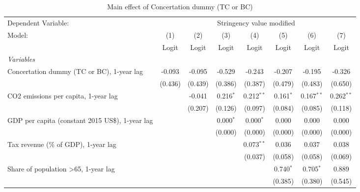 
\begin{table}[htbp]
   \caption{Main effect of Concertation dummy (TC or BC)}
   \centering
   \begin{tabular}{lccccccc}
      \toprule
      Dependent Variable: & \multicolumn{7}{c}{Stringency value modified}\\
      Model:                                                & (1)     & (2)     & (3)         & (4)          & (5)         & (6)          & (7)\\  
                                                            &  Logit  & Logit   & Logit       & Logit        & Logit       & Logit        & Logit\\  
      \midrule
      \emph{Variables}\\
      Concertation dummy (TC or BC), 1-year lag             & -0.093  & -0.095  & -0.529      & -0.243       & -0.207      & -0.195       & -0.326\\   
                                                            & (0.436) & (0.439) & (0.386)     & (0.387)      & (0.479)     & (0.483)      & (0.650)\\   
      CO2 emissions per capita, 1-year lag                  &         & -0.041  & 0.216$^{*}$ & 0.212$^{**}$ & 0.161$^{*}$ & 0.167$^{**}$ & 0.262$^{**}$\\   
                                                            &         & (0.207) & (0.126)     & (0.097)      & (0.084)     & (0.085)      & (0.118)\\   
      GDP per capita (constant 2015 US\$), 1-year lag       &         &         & 0.000$^{*}$ & 0.000$^{*}$  & 0.000       & 0.000        & 0.000\\   
                                                            &         &         & (0.000)     & (0.000)      & (0.000)     & (0.000)      & (0.000)\\   
      Tax revenue (\% of GDP), 1-year lag                   &         &         &             & 0.073$^{**}$ & 0.036       & 0.037        & 0.038\\   
                                                            &         &         &             & (0.037)      & (0.058)     & (0.058)      & (0.069)\\   
      Share of population >65, 1-year lag                   &         &         &             &              & 0.740$^{*}$ & 0.705$^{*}$  & 0.889\\   
                                                            &         &         &             &              & (0.385)     & (0.380)      & (0.545)\\   

\end{tabular}
\end{table}
